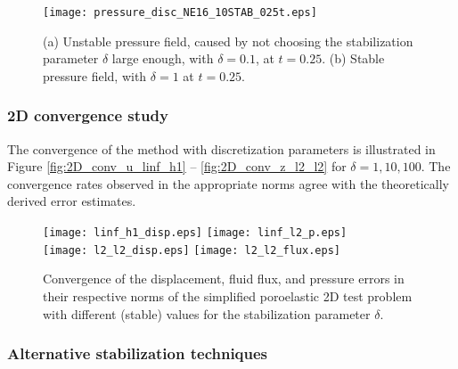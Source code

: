 \begin{figure}[h]
\begin{center}
\subfloat[]{\label{fig:stable}}  {\texttt{[image: pressure\_disc\_NE16\_10STAB\_025t.eps]}}
\caption{(a) Unstable pressure field, caused by not choosing the stabilization parameter $\delta$ large enough, with $\delta=0.1$, at $t=0.25$. (b) Stable pressure field, with $\delta=1$ at $t=0.25$.}
\end{center}
\end{figure}




\subsubsection{2D convergence study}
The convergence of the method with discretization parameters is illustrated in Figure \ref{fig:2D_conv_u_linf_h1} -- \ref{fig:2D_conv_z_l2_l2}  for $\delta=1,10,100$. The convergence rates observed in the appropriate norms agree with the theoretically derived error estimates. %

\begin{figure}[h]
\begin{center}
  \subfloat[]{\label{fig:2D_conv_u_linf_h1}} {\texttt{[image: linf\_h1\_disp.eps]}}
  \subfloat[]{\label{fig:2D_conv_p_linf_l2}} {\texttt{[image: linf\_l2\_p.eps]}}\\
  \subfloat[]{\label{fig:2D_conv_u_l2_l2}}   {\texttt{[image: l2\_l2\_disp.eps]}}
  \subfloat[]{\label{fig:2D_conv_z_l2_l2}}   {\texttt{[image: l2\_l2\_flux.eps]}}
\caption{Convergence of the displacement, fluid flux, and pressure errors in their respective norms of the simplified poroelastic 2D test problem with different (stable) values for the stabilization parameter $ \delta$.}
\end{center}
\end{figure}

\subsubsection{Alternative stabilization techniques}

